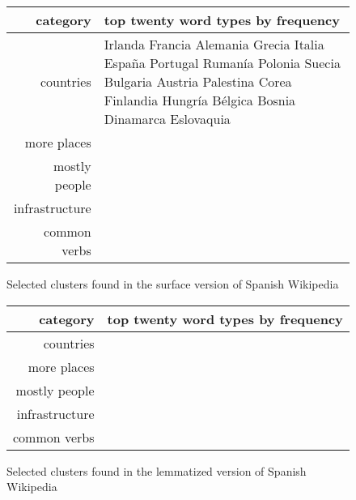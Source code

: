 \begin{figure*}[t!]
  \begin{tabular}{|r|p{10cm}|}
    \hline
    category  & top twenty word types by frequency \\
    \hline
    countries & Irlanda Francia Alemania Grecia Italia España Portugal Rumanía Polonia Suecia Bulgaria Austria Palestina Corea Finlandia Hungría Bélgica Bosnia Dinamarca Eslovaquia\\
    \hline
    more places & \\
    \hline
    mostly people & \\
    \hline
    infrastructure & \\
    \hline
    common verbs & \\
    \hline
  \end{tabular}
\caption{Selected clusters found in the surface version of Spanish Wikipedia}
\label{fig:clusters-wikipedia-surface}
\end{figure*}

\begin{figure*}[t!]
  \begin{tabular}{|r|p{10cm}|}
    \hline
    category  & top twenty word types by frequency \\
    \hline
    countries &  \\
    \hline
    more places & \\
    \hline
    mostly people & \\
    \hline
    infrastructure & \\
    \hline
    common verbs & \\
    \hline
  \end{tabular}
\caption{Selected clusters found in the lemmatized version of Spanish Wikipedia}
\label{fig:clusters-wikipedia-lemma}
\end{figure*}

